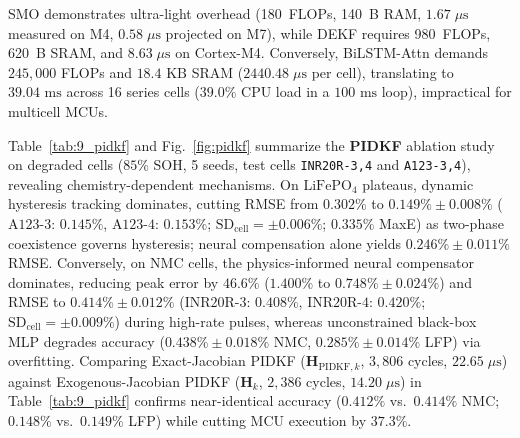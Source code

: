 \documentclass[balance,nocopyright,upint,varvw,hyphenate,barcolor=NavyBlue,nolists]{asmejour}
\begin{document}
 SMO demonstrates ultra-light overhead (180~FLOPs, 140~B RAM, $1.67\;\mu\text{s}$ measured on M4, $0.58\;\mu\text{s}$ projected on M7), while DEKF requires 980~FLOPs, 620~B SRAM, and $8.63\;\mu\text{s}$ on Cortex-M4. Conversely, BiLSTM-Attn demands $245,000$ FLOPs and $18.4\text{ KB}$ SRAM ($2440.48\;\mu\text{s}$ per cell), translating to $39.04\text{ ms}$ across 16 series cells ($39.0\%$ CPU load in a $100\text{ ms}$ loop), impractical for multicell MCUs.

Table~\ref{tab:9_pidkf} and Fig.~\ref{fig:pidkf} summarize the \textbf{PIDKF} ablation study on degraded cells ($85\%$ SOH, 5 seeds, test cells \texttt{INR20R-3,4} and \texttt{A123-3,4}), revealing chemistry-dependent mechanisms. On $\text{LiFePO}_4$ plateaus, dynamic hysteresis tracking dominates, cutting RMSE from $0.302\%$ to $0.149\% \pm 0.008\%$ ($\text{A123-3}$: $0.145\%$, $\text{A123-4}$: $0.153\%$; $\text{SD}_{\text{cell}} = \pm 0.006\%$; $0.335\%$ MaxE) as two-phase coexistence governs hysteresis; neural compensation alone yields $0.246\% \pm 0.011\%$ RMSE. Conversely, on NMC cells, the physics-informed neural compensator dominates, reducing peak error by $46.6\%$ ($1.400\%$ to $0.748\% \pm 0.024\%$) and RMSE to $0.414\% \pm 0.012\%$ ($\text{INR20R-3}$: $0.408\%$, $\text{INR20R-4}$: $0.420\%$; $\text{SD}_{\text{cell}} = \pm 0.009\%$) during high-rate pulses, whereas unconstrained black-box MLP degrades accuracy ($0.438\% \pm 0.018\%$ NMC, $0.285\% \pm 0.014\%$ LFP) via overfitting. Comparing Exact-Jacobian PIDKF ($\mathbf{H}_{\text{PIDKF},k}$, $3,806$ cycles, $22.65\;\mu\text{s}$) against Exogenous-Jacobian PIDKF ($\mathbf{H}_k$, $2,386$ cycles, $14.20\;\mu\text{s}$) in Table~\ref{tab:9_pidkf} confirms near-identical accuracy ($0.412\%$ vs.\ $0.414\%$ NMC; $0.148\%$ vs.\ $0.149\%$ LFP) while cutting MCU execution by $37.3\%$.
\end{document}
